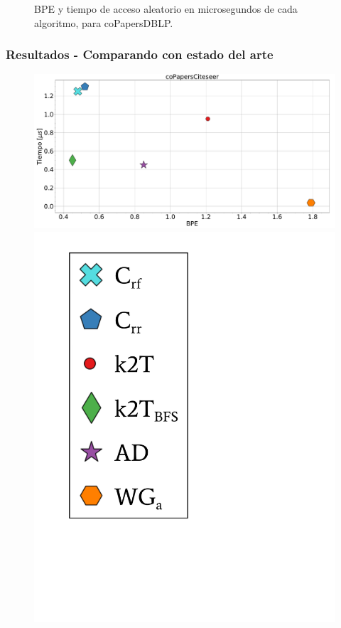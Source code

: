 \begin{frame}
\begin{figure}
	\caption{BPE y tiempo de acceso aleatorio en microsegundos de cada algoritmo, para coPapersDBLP.}
\end{figure}

\end{frame}

\begin{frame}
\frametitle{Resultados - Comparando con estado del arte}

\begin{figure}
	\centering
	
    	\begin{minipage}{1\textwidth}
    		\centering
    		\begin{minipage}{0.8\textwidth}
    			\centering
    			\includegraphics[width=1\linewidth]{../img/bpeTimes/aleatorio/coPapersCiteseer.pdf}
    		\end{minipage}
    		\begin{minipage}{0.15\textwidth}
    			\centering
    			\includegraphics[scale=.16, clip, trim=70 200 280 40]{../img/bpeTimes/labelAle.pdf}

\end{minipage}
\end{minipage}
\end{figure}
\end{frame}
